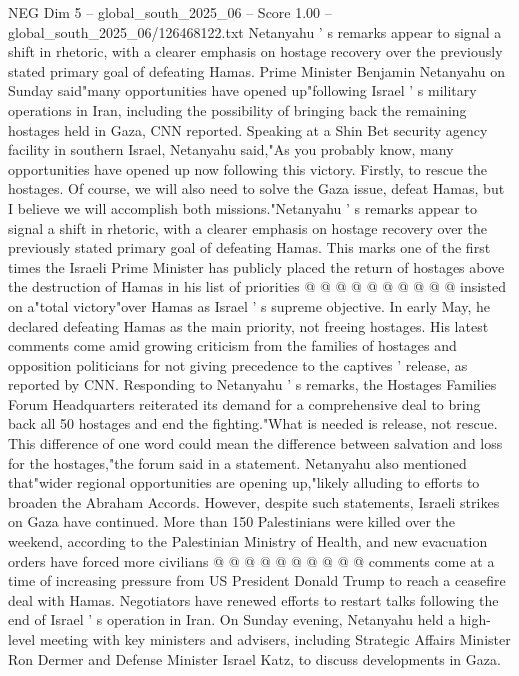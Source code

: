 \begin{textsample}{NEG Dim 5 – global\_south\_2025\_06 – Score 1.00 – global\_south\_2025\_06/126468122.txt}  \label{ex:f5_neg_397}
Netanyahu ' s remarks appear to signal a shift in rhetoric, with a clearer emphasis on hostage recovery over the previously stated primary goal of defeating Hamas.
Prime Minister Benjamin Netanyahu on Sunday said"many opportunities have opened up"following Israel ' s military operations in Iran, including the possibility of bringing back the remaining hostages held in Gaza, CNN reported.
Speaking at a Shin Bet security agency facility in southern Israel, Netanyahu said,"As you probably know, many opportunities have opened up now following this victory.
Firstly, to rescue the hostages.
Of course, we will also need to solve the Gaza issue, defeat Hamas, but I believe we will accomplish both missions."Netanyahu ' s remarks appear to signal a shift in rhetoric, with a clearer emphasis on hostage recovery over the previously stated primary goal of defeating Hamas.
This marks one of the first times the Israeli Prime Minister has publicly placed the return of hostages above the destruction of Hamas in his list of priorities @ @ @ @ @ @ @ @ @ @ insisted on a"total victory"over Hamas as Israel ' s supreme objective.
In early May, he declared defeating Hamas as the main priority, not freeing hostages.
His latest comments come amid growing criticism from the families of hostages and opposition politicians for not giving precedence to the captives ' release, as reported by CNN.
Responding to Netanyahu ' s remarks, the Hostages Families Forum Headquarters reiterated its demand for a comprehensive deal to bring back all 50 hostages and end the fighting."What is needed is release, not rescue.
This difference of one word could mean the difference between salvation and loss for the hostages,"the forum said in a statement.
Netanyahu also mentioned that"wider regional opportunities are opening up,"likely alluding to efforts to broaden the Abraham Accords.
However, despite such statements, Israeli strikes on Gaza have continued.
More than 150 Palestinians were killed over the weekend, according to the Palestinian Ministry of Health, and new evacuation orders have forced more civilians @ @ @ @ @ @ @ @ @ @ comments come at a time of increasing pressure from US President Donald Trump to reach a ceasefire deal with Hamas.
Negotiators have renewed efforts to restart talks following the end of Israel ' s operation in Iran.
On Sunday evening, Netanyahu held a high-level meeting with key ministers and advisers, including Strategic Affairs Minister Ron Dermer and Defense Minister Israel Katz, to discuss developments in Gaza.

\end{textsample}
